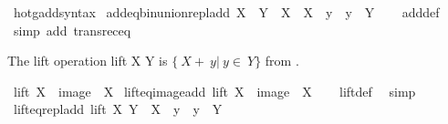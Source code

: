 \begin{isabellebody}
\isanewline
{}\isamarkupfalse%
\ hotg{\isacharunderscore}{\kern0pt}add{\isacharunderscore}{\kern0pt}syntax\isanewline
\isanewline
{}\isamarkupfalse%
\ add{\isacharunderscore}{\kern0pt}eq{\isacharunderscore}{\kern0pt}bin{\isacharunderscore}{\kern0pt}union{\isacharunderscore}{\kern0pt}repl{\isacharunderscore}{\kern0pt}add{\isacharcolon}{\kern0pt}\ {\isachardoublequoteopen}X\ {\isacharplus}{\kern0pt}\ Y\ {\isacharequal}{\kern0pt}\ X\ {\isasymunion}\ {\isacharbraceleft}{\kern0pt}X\ {\isacharplus}{\kern0pt}\ y\ {\isacharbar}{\kern0pt}\ y\ {\isasymin}\ Y{\isacharbraceright}{\kern0pt}{\isachardoublequoteclose}\isanewline
%
\isadelimproof
\ \ %
\endisadelimproof
%
\isatagproof
{}\isamarkupfalse%
\ add{\isacharunderscore}{\kern0pt}def\ \isamarkupfalse%
\ {\isacharparenleft}{\kern0pt}simp\ add{\isacharcolon}{\kern0pt}\ transrec{\isacharunderscore}{\kern0pt}eq{\isacharparenright}{\kern0pt}%
\endisatagproof
{\isafoldproof}%
%
\isadelimproof
%
\endisadelimproof
%
\begin{isamarkuptext}%
The lift operation lift X Y is $\{\ X +\ y |\ y \in\ Y\}$ from \cite{kirby_set_arithemtics}.%
\end{isamarkuptext}\isamarkuptrue%
\isamarkupfalse%
\ {\isachardoublequoteopen}lift\ X\ {\isasymequiv}\ image\ {\isacharparenleft}{\kern0pt}{\isacharparenleft}{\kern0pt}{\isacharplus}{\kern0pt}{\isacharparenright}{\kern0pt}\ X{\isacharparenright}{\kern0pt}{\isachardoublequoteclose}\isanewline
\isanewline
{}\isamarkupfalse%
\ lift{\isacharunderscore}{\kern0pt}eq{\isacharunderscore}{\kern0pt}image{\isacharunderscore}{\kern0pt}add{\isacharcolon}{\kern0pt}\ {\isachardoublequoteopen}lift\ X\ {\isacharequal}{\kern0pt}\ image\ {\isacharparenleft}{\kern0pt}{\isacharparenleft}{\kern0pt}{\isacharplus}{\kern0pt}{\isacharparenright}{\kern0pt}\ X{\isacharparenright}{\kern0pt}{\isachardoublequoteclose}\isanewline
%
\isadelimproof
\ \ %
\endisadelimproof
%
\isatagproof
{}\isamarkupfalse%
\ lift{\isacharunderscore}{\kern0pt}def\ \isamarkupfalse%
\ simp%
\endisatagproof
{\isafoldproof}%
%
\isadelimproof
\isanewline
%
\endisadelimproof
\isanewline
{}\isamarkupfalse%
\ lift{\isacharunderscore}{\kern0pt}eq{\isacharunderscore}{\kern0pt}repl{\isacharunderscore}{\kern0pt}add{\isacharcolon}{\kern0pt}\ {\isachardoublequoteopen}lift\ X\ Y\ {\isacharequal}{\kern0pt}\ {\isacharbraceleft}{\kern0pt}X\ {\isacharplus}{\kern0pt}\ y\ {\isacharbar}{\kern0pt}\ y\ {\isasymin}\ Y{\isacharbraceright}{\kern0pt}{\isachardoublequoteclose}\isanewline

\end{isabellebody}
